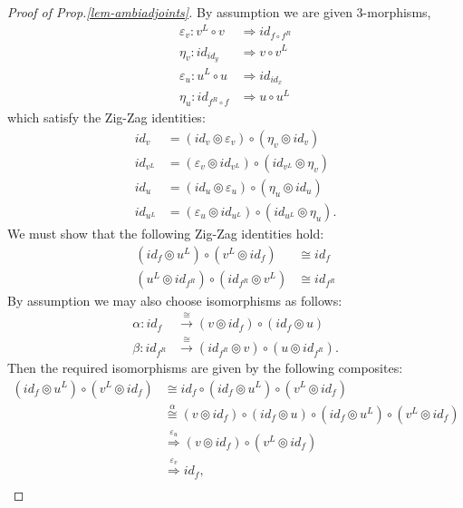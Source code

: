 \documentclass{amsart}
\begin{document}
\begin{proof}[Proof of Prop.\ref{lem-ambiadjoints}]
By assumption we are given 3-morphisms,
\begin{align*}
	\varepsilon_v: v^L \circ v & \Rightarrow id_{f \circ f^R} \\
	\eta_v: id_{id_y} & \Rightarrow v \circ v^L \\
	\varepsilon_u: u^L \circ u & \Rightarrow id_{id_x} \\
	\eta_u: id_{f^R \circ f} & \Rightarrow  u \circ u^L
\end{align*}
which satisfy the Zig-Zag identities:
\begin{align*}
	 id_v  &= (id_v \circledcirc \varepsilon_v) \circ (\eta_v \circledcirc id_v)  \\
	 id_{v^L}  &= (\varepsilon_v \circledcirc id_{v^L} ) \circ (id_{v^L} \circledcirc \eta_v)  \\
	 id_u  &= (id_u \circledcirc \varepsilon_u) \circ (\eta_u \circledcirc id_u)  \\
	 id_{u^L}  &= (\varepsilon_u \circledcirc id_{u^L} ) \circ (id_{u^L} \circledcirc \eta_u).  
\end{align*}
We must show that the following Zig-Zag identities hold:
\begin{align*}
	 (id_{f} \circledcirc u^L) \circ (v^L \circledcirc id_{f} ) & \cong id_{f} \\
 	 (u^L \circledcirc id_{f^R}) \circ (id_{f^R} \circledcirc v^L) & \cong id_{f^R} 
\end{align*}
By assumption we may also choose isomorphisms as follows:
\begin{align*}
	\alpha: id_f &\stackrel{\cong}{\to} (v \circledcirc id_f) \circ (id_f \circledcirc u) \\
	\beta: id_{f^R} &\stackrel{\cong}{\to} (id_{f^R} \circledcirc v) \circ (u \circledcirc id_{f^R} ).
\end{align*}
Then the required isomorphisms are given by the following composites:
\begin{align*}
	(id_{f} \circledcirc u^L) \circ (v^L \circledcirc id_{f} )
		& \cong id_f \circ (id_{f} \circledcirc u^L) \circ (v^L \circledcirc id_{f} ) \\
		& \stackrel{\alpha}{\cong} (v \circledcirc id_f) \circ (id_f \circledcirc u) \circ (id_{f} \circledcirc u^L) \circ (v^L \circledcirc id_{f} ) \\
		&  \stackrel{\varepsilon_u }{\Rightarrow} (v \circledcirc id_f) \circ (v^L \circledcirc id_{f} ) \\
		& \stackrel{\varepsilon_v }{\Rightarrow} id_{f},  \\

\end{align*}
\end{proof}
\end{document}
